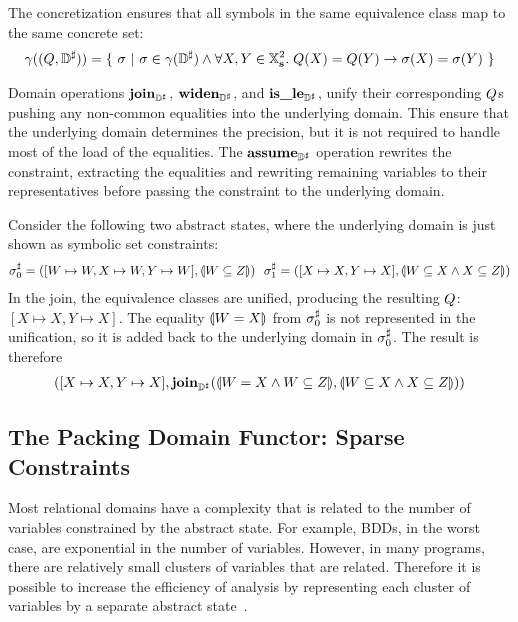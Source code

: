 The concretization ensures that all symbols in the same equivalence class map to the same concrete set:
\begin{align*}
\gamma((Q,{\mathbb{D}}^{\sharp})) = \{ \ \sigma \ | \ \sigma \in \gamma({\mathbb{D}}^{\sharp}) \wedge \forall X,Y \in \mathbb{X}_{\bf s}^2. \; Q(X) = Q(Y) \rightarrow \sigma(X) = \sigma(Y) \ \}
\end{align*}

Domain operations $\textbf{join}_{{\mathbb{D}}^{\sharp}}$, $\textbf{widen}_{{\mathbb{D}}^{\sharp}}$, and $\textbf{is\_le}_{{\mathbb{D}}^{\sharp}}$, unify their corresponding $Q$s pushing any non-common equalities into the underlying domain.  This ensure that the underlying domain determines the precision, but it is not required to handle most of the load of the equalities.  The $\textbf{assume}_{{\mathbb{D}}^{\sharp}}$ operation rewrites the constraint, extracting the equalities and rewriting remaining variables to their representatives before passing the constraint to the underlying domain.
 

\begin{example}
Consider the following two abstract states, where the underlying domain is just shown as symbolic set constraints:
\begin{align*}
  \astate_0 = ([W \mapsto W, X \mapsto W, Y \mapsto W], \aform{W \subseteq Z}) \ \ 
  \astate_1 = ([X \mapsto X, Y \mapsto X], \aform{W \subseteq X \wedge X \subseteq Z})
\end{align*}
In the join, the equivalence classes are unified, producing the resulting $Q$: $[X \mapsto X, Y \mapsto X]$.  The equality $\llparenthesis W = X \rrparenthesis$ from ${\sigma}^{\sharp}_0$ is not represented in the unification, so it is added back to the underlying domain in ${\sigma}^{\sharp}_0$.  The result is therefore
\begin{align*}
  ([X \mapsto X, Y \mapsto X], \textbf{join}_{{\mathbb{D}}^{\sharp}}(\llparenthesis W = X \wedge W \subseteq Z \rrparenthesis, \llparenthesis W \subseteq X \wedge X \subseteq Z \rrparenthesis))
\end{align*}
\end{example}

\subsection{The Packing Domain Functor: Sparse Constraints}
\label{s:4:5:packs}
Most relational domains have a complexity that is related to the number of variables constrained by the abstract state.  For example, BDDs, in the worst case, are exponential in the number of variables.  However, in many programs, there are relatively small clusters of variables that are related.  Therefore it is possible to increase the efficiency of analysis by representing each cluster of variables by a separate abstract state~\cite{ens:pldi:03}.

